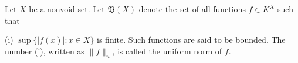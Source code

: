 Let $X$ be a nonvoid set. Let $\mathfrak{B}(X)$ denote the set of all functions $f \in K^X$ such that

(i) $\sup\{|f(x)| : x \in X\}$ is finite. Such functions are said to be bounded. The number (i), written as $\|f\|_u$, is called the uniform norm of $f$.